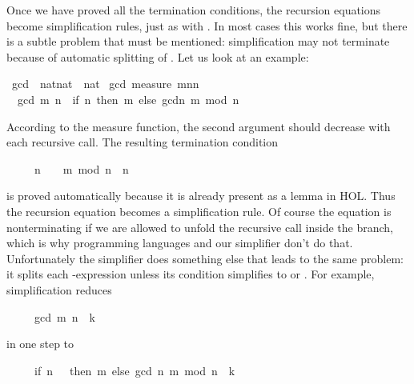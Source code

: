 %
\begin{isabellebody}%
\def\isabellecontext{simplification}%
\isamarkupfalse%
%
\begin{isamarkuptext}%
Once we have proved all the termination conditions, the  
recursion equations become simplification rules, just as with
. In most cases this works fine, but there is a subtle
problem that must be mentioned: simplification may not
terminate because of automatic splitting of .
Let us look at an example:%
\end{isamarkuptext}%
\isamarkuptrue%
\ gcd\ {\isacharcolon}{\isacharcolon}\ {\isachardoublequote}nat{\isasymtimes}nat\ {\isasymRightarrow}\ nat{\isachardoublequote}\isanewline
\isamarkupfalse%
\ gcd\ {\isachardoublequote}measure\ {\isacharparenleft}{\isasymlambda}{\isacharparenleft}m{\isacharcomma}n{\isacharparenright}{\isachardot}n{\isacharparenright}{\isachardoublequote}\isanewline
\ \ {\isachardoublequote}gcd\ {\isacharparenleft}m{\isacharcomma}\ n{\isacharparenright}\ {\isacharequal}\ {\isacharparenleft}if\ n{\isacharequal}{}\ then\ m\ else\ gcd{\isacharparenleft}n{\isacharcomma}\ m\ mod\ n{\isacharparenright}{\isacharparenright}{\isachardoublequote}\isamarkupfalse%
%
\begin{isamarkuptext}%
\noindent
According to the measure function, the second argument should decrease with
each recursive call. The resulting termination condition
\begin{isabelle}%
\ \ \ \ \ n\ {\isasymnoteq}\ {}\ {\isasymLongrightarrow}\ m\ mod\ n\ {\isacharless}\ n%
\end{isabelle}
is proved automatically because it is already present as a lemma in
HOL\@.  Thus the recursion equation becomes a simplification
rule. Of course the equation is nonterminating if we are allowed to unfold
the recursive call inside the  branch, which is why programming
languages and our simplifier don't do that. Unfortunately the simplifier does
something else that leads to the same problem: it splits 
each -expression unless its
condition simplifies to  or .  For
example, simplification reduces
\begin{isabelle}%
\ \ \ \ \ gcd\ {\isacharparenleft}m{\isacharcomma}\ n{\isacharparenright}\ {\isacharequal}\ k%
\end{isabelle}
in one step to
\begin{isabelle}%
\ \ \ \ \ {\isacharparenleft}if\ n\ {\isacharequal}\ {}\ then\ m\ else\ gcd\ {\isacharparenleft}n{\isacharcomma}\ m\ mod\ n{\isacharparenright}{\isacharparenright}\ {\isacharequal}\ k%

\end{isabelle}
\end{isamarkuptext}
\end{isabellebody}
